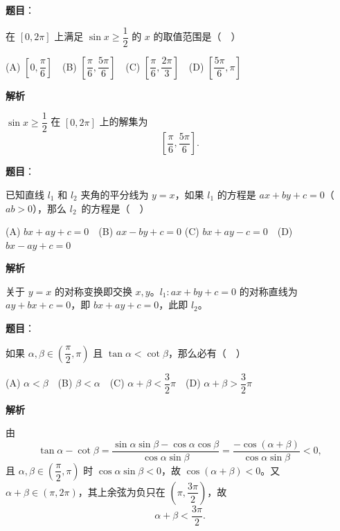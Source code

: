 \begin{answer}

\textbf{题目}：

在 \([0,2\pi]\) 上满足 \(\sin x\geqslant\dfrac{1}{2}\) 的 \(x\) 的取值范围是（　）

(A) \(\left[0,\dfrac{\pi}{6}\right]\)　(B) \(\left[\dfrac{\pi}{6},\dfrac{5\pi}{6}\right]\)　(C) \(\left[\dfrac{\pi}{6},\dfrac{2\pi}{3}\right]\)　(D) \(\left[\dfrac{5\pi}{6},\pi\right]\)

\textbf{解析}

\(\sin x\geqslant\dfrac12\) 在 \([0,2\pi]\) 上的解集为
\nopagebreak[4]
\[
\left[\frac{\pi}{6},\frac{5\pi}{6}\right].
\]


\end{answer}
\begin{answer}

\textbf{题目}：

已知直线 \(l_1\) 和 \(l_2\) 夹角的平分线为 \(y=x\)，如果 \(l_1\) 的方程是 \(ax+by+c=0\)（\(ab>0\)），那么 \mbox{\(l_2\) 的方程是（　）}

(A) \(bx+ay+c=0\)　(B) \(ax-by+c=0\)
(C) \(bx+ay-c=0\)　(D) \(bx-ay+c=0\)

\textbf{解析}

关于 \(y=x\) 的对称变换即交换 \(x,y\)。\(l_1:ax+by+c=0\) 的对称直线为 \(ay+bx+c=0\)，即 \(bx+ay+c=0\)，此即 \(l_2\)。


\end{answer}
\begin{answer}

\textbf{题目}：

如果 \(\alpha,\beta\in\left(\dfrac{\pi}{2},\pi\right)\) 且 \(\tan\alpha<\cot\beta\)，那么必有（　）

(A) \(\alpha<\beta\)　(B) \(\beta<\alpha\)　(C) \(\alpha+\beta<\dfrac{3}{2}\pi\)　(D) \(\alpha+\beta>\dfrac{3}{2}\pi\)

\textbf{解析}

由
\nopagebreak[4]
\[
\tan\alpha-\cot\beta
=\frac{\sin\alpha\sin\beta-\cos\alpha\cos\beta}{\cos\alpha\sin\beta}
=\frac{-\cos(\alpha+\beta)}{\cos\alpha\sin\beta}<0,
\]
且 \(\alpha,\beta\in\left(\dfrac{\pi}{2},\pi\right)\) 时 \(\cos\alpha\sin\beta<0\)，故 \(\cos(\alpha+\beta)<0\)。又 \(\alpha+\beta\in(\pi,2\pi)\)，其上余弦为负只在 \(\left(\pi,\dfrac{3\pi}{2}\right)\)，故
\nopagebreak[4]
\[
\alpha+\beta<\frac{3\pi}{2}.
\]


\end{answer}
